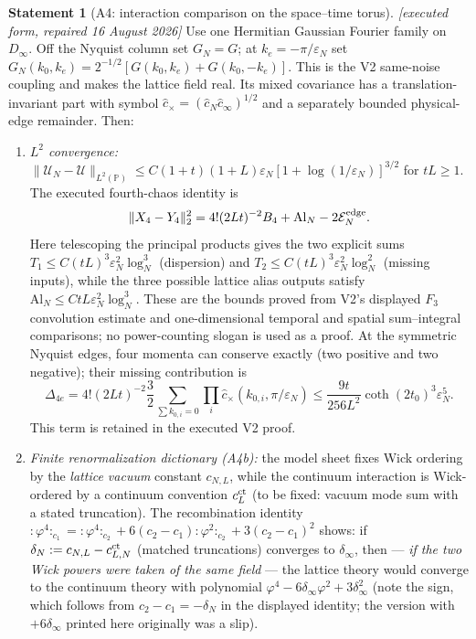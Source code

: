 \documentclass[11pt,a4paper]{article}
\theoremstyle{plain}
\theoremstyle{definition}
\newtheorem{statement}[theorem]{Statement}
\newcommand{\eps}{\varepsilon}
\begin{document}
\begin{statement}[A4: interaction comparison on the space--time torus]\label{st:A4}
\emph{[executed form, repaired 16 August 2026]} Use one Hermitian Gaussian Fourier
family on $D_\infty$.  Off the Nyquist column set $G_N=G$; at
$k_e=-\pi/\eps_N$ set
$G_N(k_0,k_e)=2^{-1/2}[G(k_0,k_e)+G(k_0,-k_e)]$.  This is the V2
same-noise coupling and makes the lattice field real.  Its mixed covariance has a
translation-invariant part with symbol
$\hat c_\times=(\hat c_N\hat c_\infty)^{1/2}$ and a separately bounded physical-edge
remainder. Then:
\begin{enumerate}
\item[\rm(a)] \emph{$L^2$ convergence:}
$\|\mathcal U_N-\mathcal U\|_{L^2(\mathbb P)}
\le C(1+t)(1+L)\eps_N[1+\log(1/\eps_N)]^{3/2}$ for $tL\ge1$.
The executed fourth-chaos identity is
\[
 \|X_4-Y_4\|_2^2=4!(2Lt)^{-2}B_4+\mathrm{Al}_N
 -2\mathcal E_N^{\rm edge}.
\]
Here telescoping the principal products gives the two explicit sums
$T_1\le C(tL)^3\eps_N^2\log_N^3$ (dispersion) and
$T_2\le C(tL)^3\eps_N^2\log_N^2$ (missing inputs), while the three possible
lattice alias outputs satisfy
$\mathrm{Al}_N\le C tL\eps_N^2\log_N^3$.  These are the bounds proved from
V2's displayed $F_3$ convolution estimate and one-dimensional temporal and
spatial sum--integral comparisons; no power-counting slogan is used as a proof.
At the symmetric Nyquist edges,
four momenta can conserve exactly (two positive and two negative); their missing
contribution is
\[
 \Delta_{4e}=4!(2Lt)^{-2}\frac32
 \sum_{\sum k_{0,i}=0}\prod_i\hat c_\times(k_{0,i},\pi/\eps_N)
 \le\frac{9t}{256L^2}\coth(2t_0)^3\eps_N^5.
\]
This term is retained in the executed V2 proof.
\item[\rm(b)] \emph{Finite renormalization dictionary (A4b):} the model sheet fixes
Wick ordering by the \emph{lattice vacuum} constant $c_{N,L}$, while the continuum
interaction is Wick-ordered by a continuum convention $c^{\rm ct}_{L}$ (to be fixed:
vacuum mode sum with a stated truncation). The recombination identity
${:}\varphi^4{:}_{c_1}={:}\varphi^4{:}_{c_2}+6(c_2-c_1){:}\varphi^2{:}_{c_2}
+3(c_2-c_1)^2$ shows: if
$\delta_N:=c_{N,L}-c^{\rm ct}_{L,N}$ (matched truncations) converges to
$\delta_\infty$, then --- \emph{if the two Wick powers were taken of the same field}
--- the lattice theory would converge to the continuum theory with polynomial
$\varphi^4-6\delta_\infty\varphi^2+3\delta_\infty^2$ (note the sign, which follows from
$c_2-c_1=-\delta_N$ in the displayed identity; the version with $+6\delta_\infty$
printed here originally was a slip).

\end{enumerate}
\end{statement}
\end{document}
